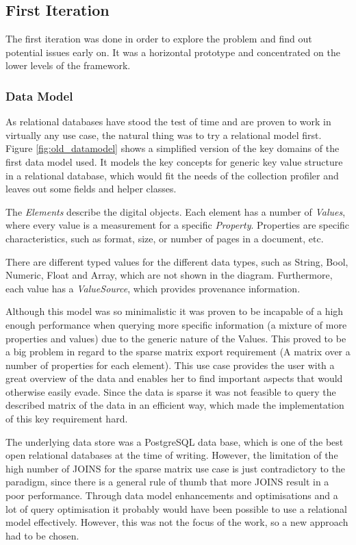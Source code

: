 \subsection{First Iteration}
The first iteration was done in order to explore the problem and find out potential issues early on. It was a horizontal prototype and concentrated on the lower levels of the framework.

\subsubsection{Data Model}
As relational databases have stood the test of time and are proven to work in virtually any use case, the natural thing was to try a relational model first. Figure \ref{fig:old_datamodel} shows a simplified version of the key domains of the first data model used. It models the key concepts for generic key value structure in a relational database, which would fit the needs of the collection profiler and leaves out some fields and helper classes. 

The \textit{Elements} describe the digital objects. Each element has a number of \textit{Values}, where every value is a measurement for a specific \textit{Property}. Properties are specific characteristics, such as format, size, or number of pages in a document, etc. 

There are different typed values for the different data types, such as String, Bool, Numeric, Float and Array, which are not shown in the diagram. Furthermore, each value has a \textit{ValueSource}, which provides provenance information.

Although this model was so minimalistic it was proven to be incapable of a high enough performance when querying more specific information (a mixture of more properties and values) due to the generic nature of the Values. This proved to be a big problem in regard to the sparse matrix export requirement (A matrix over a number of properties for each element). This use case provides the user with a great overview of the data and enables her to find important aspects that would otherwise easily evade. Since the data is sparse it was not feasible to query the described matrix of the data in an efficient way, which made the implementation of this key requirement hard.

The underlying data store was a PostgreSQL data base, which is one of the best open relational databases at the time of writing. However, the limitation of the high number of JOINS for the sparse matrix use case is just contradictory to the paradigm, since there is a general rule of thumb that more JOINS result in a poor performance. Through data model enhancements and optimisations and a lot of query optimisation it probably would have been possible to use a relational model effectively. However, this was not the focus of the work, so a new approach had to be chosen.

